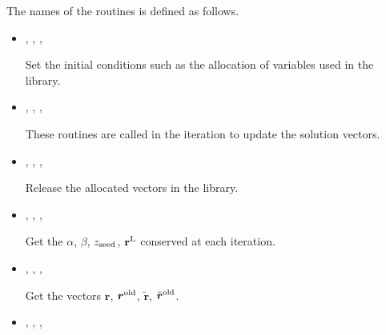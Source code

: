 \documentclass[letterpaper,10pt,dvipdfmx,openany]{sphinxmanual}
\begin{document}
The names of the routines is defined as follows.
\begin{itemize}
\item {} 
, ,
, 

Set the initial conditions such as the allocation of variables used
in the library.

\item {} 
, ,
, 

These routines are called in the iteration to update the solution
vectors.

\item {} 
, ,
, 

Release the allocated vectors in the library.

\item {} 
, ,
, 

Get the \(\alpha\), \(\beta\), \(z_{\rm seed}\),
\({\bf r}^{\rm L}\) conserved at each iteration.

\item {} 
, ,
, 

Get the vectors \({\boldsymbol r}\),
\({\boldsymbol r}^{\rm old}\), \({\tilde {\boldsymbol r}}\),
\({\tilde {\boldsymbol r}}^{\rm old}\).

\item {} 
, ,
, 

\end{itemize}
\end{document}
